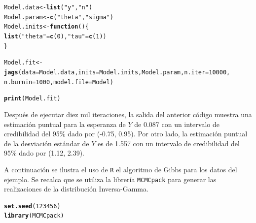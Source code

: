 \documentclass[10pt,openright]{book}\usepackage[]{graphicx}\usepackage[]{color}
\makeatletter
\newcommand{\hlnum}[1]{\textcolor[rgb]{0.686,0.059,0.569}{#1}}%
\newcommand{\hlstr}[1]{\textcolor[rgb]{0.192,0.494,0.8}{#1}}%
\newcommand{\hlstd}[1]{\textcolor[rgb]{0.345,0.345,0.345}{#1}}%
\newcommand{\hlkwa}[1]{\textcolor[rgb]{0.161,0.373,0.58}{\textbf{#1}}}%
\newcommand{\hlkwb}[1]{\textcolor[rgb]{0.69,0.353,0.396}{#1}}%
\newcommand{\hlkwc}[1]{\textcolor[rgb]{0.333,0.667,0.333}{#1}}%
\newcommand{\hlkwd}[1]{\textcolor[rgb]{0.737,0.353,0.396}{\textbf{#1}}}%
\newenvironment{kframe}{%
 \def\at@end@of@kframe{}%
 \ifinner\ifhmode%
  \def\at@end@of@kframe{\end{minipage}}%
  \begin{minipage}{\columnwidth}%
 \fi\fi%
 \def\FrameCommand##1{\hskip\@totalleftmargin \hskip-\fboxsep
 \colorbox{shadecolor}{##1}\hskip-\fboxsep
     \hskip-\linewidth \hskip-\@totalleftmargin \hskip\columnwidth}%
 \MakeFramed {\advance\hsize-\width
   \@totalleftmargin\z@ \linewidth\hsize
   \@setminipage}}%
 {\par\unskip\endMakeFramed%
 \at@end@of@kframe}
\newenvironment{knitrout}{}{} %
\makeatother
\begin{document}
\begin{Eje}
\begin{knitrout}
\begin{kframe}
\begin{alltt}
\hlstd{Model.data} \hlkwb{<-} \hlkwd{list}\hlstd{(}\hlstr{"y"}\hlstd{,}\hlstr{"n"}\hlstd{)}
\hlstd{Model.param} \hlkwb{<-} \hlkwd{c}\hlstd{(}\hlstr{"theta"}\hlstd{,} \hlstr{"sigma"}\hlstd{)}
\hlstd{Model.inits} \hlkwb{<-} \hlkwa{function}\hlstd{()\{}
  \hlkwd{list}\hlstd{(}\hlstr{"theta"}\hlstd{=}\hlkwd{c}\hlstd{(}\hlnum{0}\hlstd{),} \hlstr{"tau"}\hlstd{=}\hlkwd{c}\hlstd{(}\hlnum{1}\hlstd{))}
\hlstd{\}}

\hlstd{Model.fit} \hlkwb{<-} \hlkwd{jags}\hlstd{(}\hlkwc{data}\hlstd{=Model.data,} \hlkwc{inits}\hlstd{=Model.inits, Model.param,} \hlkwc{n.iter}\hlstd{=}\hlnum{10000}\hlstd{,}
               \hlkwc{n.burnin}\hlstd{=}\hlnum{1000}\hlstd{,} \hlkwc{model.file}\hlstd{=Model)}

\hlkwd{print}\hlstd{(Model.fit)}
\end{alltt}
\end{kframe}
\end{knitrout}

Despu\'es de ejecutar diez mil iteraciones, la salida del anterior c\'odigo muestra una estimaci\'on puntual para la esperanza de $Y$ de 0.087 con un intervalo de credibilidad del 95\% dado por (-0.75, 0.95). Por otro lado, la estimaci\'on puntual de la desviaci\'on est\'andar de $Y$ es de 1.557 con un intervalo de credibilidad del 95\% dado por (1.12, 2.39).

A continuaci\'on se ilustra el uso de \verb'R' el algoritmo de Gibbs para los datos del ejemplo. Se recalca que se utiliza la librer\'ia \verb"MCMCpack" \cite{MCMCpack} para generar las realizaciones de la distribuci\'on Inversa-Gamma.

\begin{knitrout}
\color{fgcolor}\begin{kframe}
\begin{alltt}
\hlkwd{set.seed}\hlstd{(}\hlnum{123456}\hlstd{)}
\hlkwd{library}\hlstd{(MCMCpack)}
\end{alltt}


{\ttfamily\noindent\itshape\color{messagecolor}{\#\# Loading required package: MASS}}

{\ttfamily\noindent\itshape\color{messagecolor}{\#\# \#\#\\\#\# \#\# Markov Chain Monte Carlo Package (MCMCpack)}}

{\ttfamily\noindent\itshape\color{messagecolor}{\#\# \#\# Copyright (C) 2003-2018 Andrew D. Martin, Kevin M. Quinn, and Jong Hee Park}}

{\ttfamily\noindent\itshape\color{messagecolor}{\#\# \#\#\\\#\# \#\# Support provided by the U.S. National Science Foundation}}


\end{kframe}
\end{knitrout}
\end{Eje}
\end{document}
